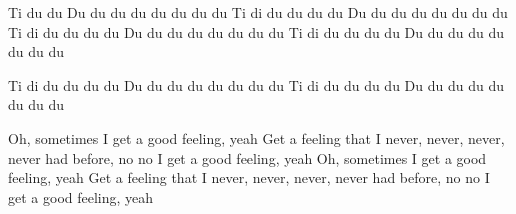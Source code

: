 \begin{verse*}
Ti du du
Du du du du du du du du
Ti di du du du du
Du du du du du du du du
Ti di du du du du
Du du du du du du du du
Ti di du du du du
Du du du du du du du du
\end{verse*}

\begin{chorus}
Ti di du du du du
Du du du du du du du du
Ti di du du du du
Du du du du du du du du

\end{chorus}


\begin{verse*}
Oh, sometimes I get a good feeling, yeah
Get a feeling that I never, never, never, never had before, no no
I get a good feeling, yeah
Oh, sometimes I get a good feeling, yeah
Get a feeling that I never, never, never, never had before, no no
I get a good feeling, yeah
\end{verse*}

